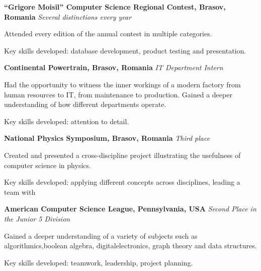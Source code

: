 
\bigskip
{}%
\textbf{“Grigore Moisil” Computer Science Regional Contest, Brasov, Romania} \newline
\emph{Several distinctions every year} 
\begin{itemize*}
  \item Attended every edition of the annual contest in multiple categories.
  \item Key skills developed: database development, product testing and presentation.
\end{itemize*}

\smallskip
\textbf{Continental Powertrain, Brasov, Romania} \newline
\emph{IT Department Intern} 
\begin{itemize*}
  \item Had the opportunity to witness the inner workings of a modern factory from human
  resources to IT, from maintenance to production. Gained a deeper understanding of
  how different departments operate.
  \item Key skills developed: attention to detail.
\end{itemize*}

\smallskip
\textbf{National Physics Symposium, Brasov, Romania} \newline
\emph{Third place} 
\begin{itemize*}
  \item Created and presented a cross-discipline project illustrating the usefulness of computer
  science in physics.
  \item Key skills developed: applying different concepts across disciplines, leading a team with
\end{itemize*}

\smallskip
\textbf{American Computer Science League, Pennsylvania, USA} \newline
\emph{Second Place in the Junior 5 Division} 
\begin{itemize*}
  \item Gained a deeper understanding of a variety of subjects such as algorithmics,boolean
  algebra, digitalelectronics, graph theory and data structures.
  \item Key skills developed: teamwork, leadership, project planning.
\end{itemize*}

